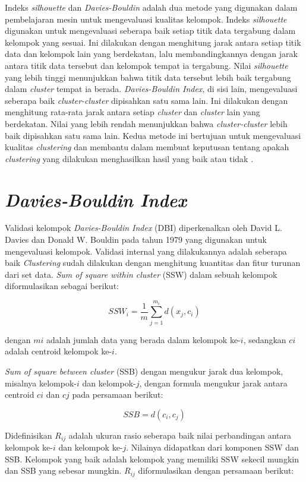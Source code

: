 Indeks \textit{silhouette} dan \textit{Davies-Bouldin} adalah dua metode yang digunakan dalam pembelajaran mesin untuk mengevaluasi kualitas kelompok. Indeks \textit{silhouette} digunakan untuk mengevaluasi seberapa baik setiap titik data tergabung dalam kelompok yang sesuai. Ini dilakukan dengan menghitung jarak antara setiap titik data dan kelompok lain yang berdekatan, lalu membandingkannya dengan jarak antara titik data tersebut dan kelompok tempat ia tergabung. Nilai \textit{silhouette} yang lebih tinggi menunjukkan bahwa titik data tersebut lebih baik tergabung dalam \textit{cluster} tempat ia berada. \textit{Davies-Bouldin Index}, di sisi lain, mengevaluasi seberapa baik \textit{cluster-cluster} dipisahkan satu sama lain. Ini dilakukan dengan menghitung rata-rata jarak antara setiap \textit{cluster} dan \textit{cluster} lain yang berdekatan. Nilai yang lebih rendah menunjukkan bahwa \textit{cluster-cluster} lebih baik dipisahkan satu sama lain. Kedua metode ini bertujuan untuk mengevaluasi kualitas \textit{clustering} dan membantu dalam membuat keputusan tentang apakah \textit{clustering} yang dilakukan menghasilkan hasil yang baik atau tidak \citep{Dan2015}.

\section{\textit{Davies-Bouldin Index}}

Validasi kelompok \textit{Davies-Bouldin Index} (DBI) diperkenalkan oleh David L. Davies dan Donald W. Bouldin pada tahun 1979 yang digunakan untuk mengevaluasi kelompok. Validasi internal yang dilakukannya adalah seberapa baik \textit{Clustering} sudah dilakukan dengan menghitung kuantitas dan fitur turunan dari set data.
\textit{Sum of square within cluster} (SSW) dalam sebuah kelompok diformulasikan sebagai berikut: 

\[
SSW_i = \frac{1}{m} \sum_{j=1}^{m_i} d(x_j, c_i)
\]

dengan $mi$ adalah jumlah data yang berada dalam  kelompok ke-$i$, sedangkan $ci$
adalah centroid kelompok ke-$i$.

\textit{Sum of square between cluster} (SSB) dengan mengukur jarak dua kelompok, misalnya kelompok-$i$ dan kelompok-$j$, dengan formula mengukur jarak antara centroid
$ci$ dan $cj$ pada persamaan berikut:

\[
SSB = d(c_i, c_j)
\]

Didefinisikan $R_{ij}$ adalah ukuran rasio seberapa baik nilai perbandingan antara kelompok ke-$i$ dan kelompok ke-$j$. Nilainya didapatkan dari komponen SSW dan SSB. Kelompok yang baik adalah kelompok yang memiliki SSW sekecil mungkin dan SSB yang sebesar mungkin. $R_{ij}$ diformulasikan dengan persamaan berikut:

